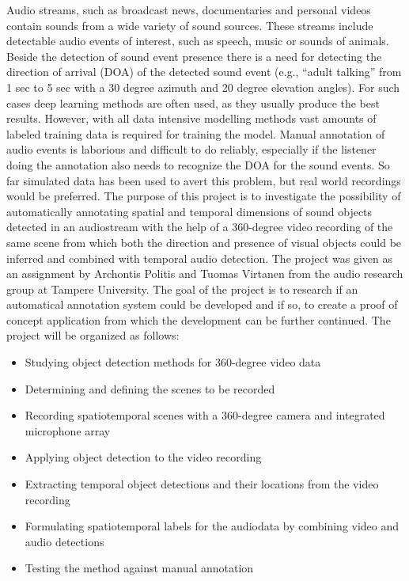 Audio streams, such as broadcast news, documentaries and personal videos contain sounds from a wide variety of sound sources. These streams include detectable audio events of interest, such as speech, music or sounds of animals. Beside the detection of sound event presence there is a need for detecting the direction of arrival (DOA) of the detected sound event (e.g., “adult talking” from 1 sec to 5 sec with a 30 degree azimuth and 20 degree elevation angles). For such cases deep learning methods are often used, as they usually produce the best results. However, with all data intensive modelling methods vast amounts of labeled training data is required for training the model. Manual annotation of audio events is laborious and difficult to do reliably, especially if the listener doing the annotation also needs to recognize the DOA for the sound events. So far simulated data has been used to avert this problem, but real world recordings would be preferred. The purpose of this project is to investigate the possibility of automatically annotating spatial and temporal dimensions of sound objects detected in an audiostream with the help of a 360-degree video recording of the same scene from which both the direction and presence of visual objects could be inferred and combined with temporal audio detection. The project was given as an assignment by Archontis Politis and Tuomas Virtanen from the audio research group at Tampere University. The goal of the project is to research if an automatical annotation system could be developed and if so, to create a proof of concept application from which the development can be further continued. The project will be organized as follows:

\begin{itemize}
	\item Studying object detection methods for 360-degree video data
	\item Determining and defining the scenes to be recorded
	\item Recording spatiotemporal scenes with a 360-degree camera and integrated microphone array
	\item Applying object detection to the video recording 
	\item Extracting temporal object detections and their locations from the video recording
	\item Formulating spatiotemporal labels for the audiodata by combining video and audio detections
	\item Testing the method against manual annotation
\end{itemize}